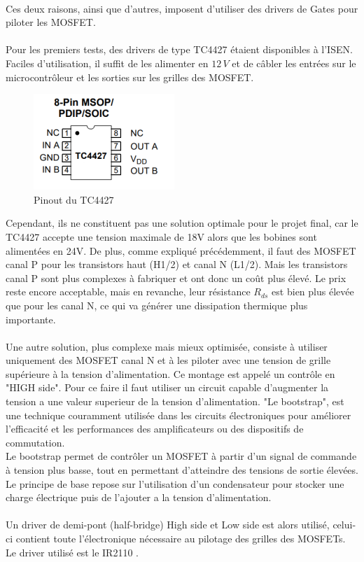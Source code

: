 \documentclass{article}
\begin{document}
\\
Ces deux raisons, ainsi que d'autres, imposent d'utiliser des drivers de Gates pour piloter les MOSFET.
\\\\
Pour les premiers tests, des drivers de type TC4427 \cite{ref11} étaient disponibles à l'ISEN. Faciles d'utilisation, il suffit de les alimenter en $12\,V$ et de câbler les entrées sur le microcontrôleur et les sorties sur les grilles des MOSFET.

    \begin{figure}[H]
    \centering
    \includegraphics[width=0.25\linewidth]{Images/tc4427.png}
    \caption{Pinout du TC4427
    }
    \label{fig:tc4427}
\end{figure}
\noindent
Cependant, ils ne constituent pas une solution optimale pour le projet final, car le TC4427 accepte une tension maximale de 18V alors que les bobines sont alimentées en 24V. De plus, comme expliqué précédemment, il faut des MOSFET canal P pour les transistors haut (H1/2) et canal N (L1/2). Mais les transistors canal P sont plus complexes à fabriquer et ont donc un coût plus élevé. Le prix reste encore acceptable, mais en revanche, leur résistance $R_{ds}$ est bien plus élevée que pour les canal N, ce qui va générer une dissipation thermique plus importante.
\\\\
Une autre solution, plus complexe mais mieux optimisée, consiste à utiliser uniquement des MOSFET canal N et à les piloter avec une tension de grille supérieure à la tension d'alimentation. Ce montage est appelé un contrôle en "HIGH side".
Pour ce faire il faut utiliser un circuit capable d'augmenter la tension a une valeur superieur de la tension d'alimentation. "Le bootstrap",  est une technique couramment utilisée dans les circuits électroniques pour améliorer l'efficacité et les performances des amplificateurs ou des dispositifs de commutation.\\
Le bootstrap permet de contrôler un MOSFET à partir d'un signal de commande à tension plus basse, tout en permettant d'atteindre des tensions de sortie élevées. Le principe de base repose sur l'utilisation d'un condensateur pour stocker une charge électrique puis de l'ajouter a la tension d'alimentation. 
\\\\
Un driver de demi-pont (half-bridge) High side et Low side est alors utilisé, celui-ci contient toute l'électronique nécessaire au pilotage des grilles des MOSFETs. Le driver utilisé est le IR2110 \cite{ref12}.
\end{document}
